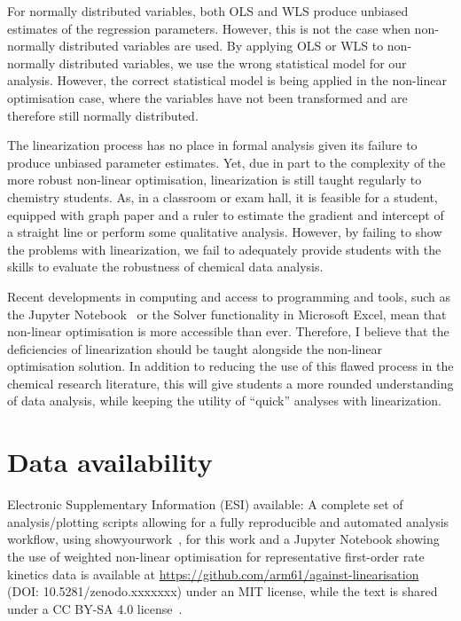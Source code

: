 \documentclass[journal=jceda8,manuscript=article]{achemso}
\begin{document}
For normally distributed variables, both OLS and WLS produce unbiased estimates of the regression parameters. 
However, this is not the case when non-normally distributed variables are used. 
By applying OLS or WLS to non-normally distributed variables, we use the wrong statistical model for our analysis. 
However, the correct statistical model is being applied in the non-linear optimisation case, where the variables have not been transformed and are therefore still normally distributed. 

The linearization process has no place in formal analysis given its failure to produce unbiased parameter estimates. 
Yet, due in part to the complexity of the more robust non-linear optimisation, linearization is still taught regularly to chemistry students. 
As, in a classroom or exam hall, it is feasible for a student, equipped with graph paper and a ruler to estimate the gradient and intercept of a straight line or perform some qualitative analysis.
However, by failing to show the problems with linearization, we fail to adequately provide students with the skills to evaluate the robustness of chemical data analysis. 

Recent developments in computing and access to programming and tools, such as the Jupyter Notebook~\cite{kluyver_jupyter_2016} or the Solver functionality in Microsoft Excel, mean that non-linear optimisation is more accessible than ever. 
Therefore, I believe that the deficiencies of linearization should be taught alongside the non-linear optimisation solution. 
In addition to reducing the use of this flawed process in the chemical research literature, this will give students a more rounded understanding of data analysis, while keeping the utility of ``quick'' analyses with linearization.

\section*{Data availability}

Electronic Supplementary Information (ESI) available: A complete set of analysis/plotting scripts allowing for a fully reproducible and automated analysis workflow, using showyourwork~\cite{luger_showyourwork_2021}, for this work and a Jupyter Notebook showing the use of weighted non-linear optimisation for representative first-order rate kinetics data is available at \url{https://github.com/arm61/against-linearisation} (DOI: 10.5281/zenodo.xxxxxxx) under an MIT license, while the text is shared under a CC BY-SA 4.0 license~\cite{mccluskey_github_2023}.
\end{document}
